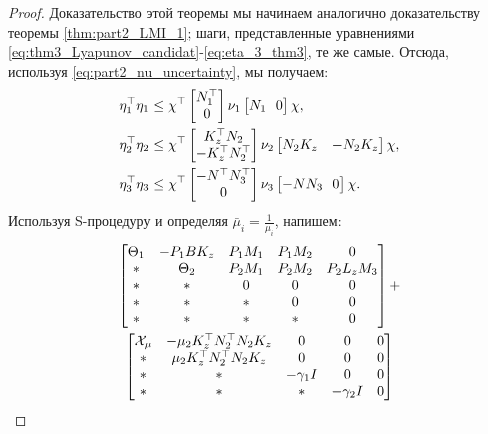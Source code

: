 \begin{proof}
	Доказательство этой теоремы мы начинаем аналогично доказательству теоремы \ref{thm:part2_LMI_1}; шаги, представленные уравнениями \eqref{eq:thm3_Lyapunov_candidat}-\eqref{eq:eta_3_thm3}, те же самые. Отсюда, используя \eqref{eq:part2_nu_uncertainty}, мы получаем:
	\begin{align}
		\label{eq:eta1_bound}
		\eta_1^\top\eta_1 &\leq \chi^\top \begin{bmatrix}
			{N}_1^\top \\ 0  
		\end{bmatrix}\nu_1\begin{bmatrix}
			{N}_1 \ \ 0  
		\end{bmatrix} \chi,
		\\
		\eta_2^\top\eta_2 &\leq \chi^\top \begin{bmatrix}
			{K}_z^\top{N}_2 \\ -{K}_z^\top{N}_2^\top  
		\end{bmatrix}\nu_2\begin{bmatrix}
			{N}_2{K}_z & -{N}_2{K}_z
		\end{bmatrix} \chi,
		\\
		\eta_3^\top\eta_3 &\leq \chi^\top \begin{bmatrix}
			-{N}^\top{N}_3^\top \\ 0  
		\end{bmatrix}\nu_3\begin{bmatrix}
			-{N}{N}_3 \ \ 0  
		\end{bmatrix} \chi.
	\end{align}
	Используя S-процедуру и определяя $\bar{\mu}_i=\frac{1}{\mu_i}$, напишем:
	\begin{multline}
		\begin{bmatrix}
			{\Theta}_1 & -{P}_1{B}{K}_z & {P}_1{M}_1 & {P}_1{M}_2 &0 \\
			* &    {\Theta}_2 & {P}_2{M}_1 & {P}_2{M}_2 & {P}_2{L}_z{M}_3\\
			* & * & 0 & 0&0\\
			* & * & * & 0&0 \\
			* & * & * & *&0
		\end{bmatrix} + \\
		\begin{bmatrix}
			\mathcal{X}_{\mu}& -\mu_2{K}_z^\top{N}_2^\top{N}_2{K}_z &0 &0 & 0\\
			*&\mu_2{K}_z^\top{N}_2^\top{N}_2{K}_z&0&0&0\\
			*&*&-\gamma_1{I}&0&0\\
			*&*&*&-\gamma_2{I}&0\\

\end{bmatrix}
\end{multline}
\end{proof}

